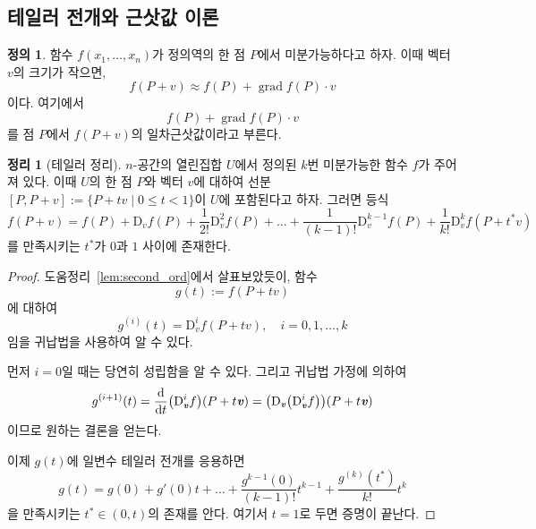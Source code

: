 \documentclass[unfonts,oneside,a4paper]{oblivoir}
\theoremstyle{definition}
\newtheorem{definition}{정의}[subsubsection]
\theoremstyle{theorem}
\newtheorem{theorem}{정리}[subsubsection]
\renewcommand{\vec}[1]{\bm{\mathit{#1}}}
\newcommand{\dD}{\mathrm{D}}
\DeclareMathOperator{\grad}{grad}
\begin{document}
\subsection{테일러 전개와 근삿값 이론}

\begin{definition}
    함수 $f(x_1, \dots, x_n)$가 정의역의 한 점 $P$에서 미분가능하다고 하자.
    이때 벡터 $\vec v$의 크기가 작으면,
    \begin{equation*}
        f(P + \vec v) \approx f(P) + \grad f(P) \cdot \vec v
    \end{equation*}
    이다.
    여기에서
    \begin{equation*}
        f(P) + \grad f(P) \cdot \vec v
    \end{equation*}
    를 점 $P$에서 $f(P + \vec v)$의 일차근삿값이라고 부른다.
\end{definition}

\begin{theorem}[테일러 정리]
    $n$-공간의 열린집합 $U$에서 정의된 $k$번 미분가능한 함수 $f$가 주어져 있다.
    이때 $U$의 한 점 $P$와 벡터 $\vec v$에 대하여 선분 $[P, P + \vec v] := \{P + t \vec v \mid 0 \leq t < 1\}$이 $U$에 포함된다고 하자.
    그러면 등식
    \begin{equation*}
        f(P + \vec v) = f(P) + \dD_{\vec v} f(P) + \frac{1}{2!} \dD_{\vec v}^2 f(P) + \dots + \frac{1}{(k - 1)!} \dD_{\vec v}^{k - 1} f(P) + \frac{1}{k!} \dD_{\vec v}^k f(P + t^* \vec v)
    \end{equation*}
    를 만족시키는 $t^*$가 $0$과 $1$ 사이에 존재한다.
\end{theorem}

\begin{proof}
    도움정리~\ref{lem:second_ord}에서 살표보았듯이, 함수
    \begin{equation*}
        g(t) := f(P + t \vec v)
    \end{equation*}
    에 대하여
    \begin{equation*}
        g^{(i)}(t) = \dD_{\vec v}^i f(P + t \vec v), \quad i = 0, 1, \dots, k
    \end{equation*}
    임을 귀납법을 사용하여 알 수 있다.

    먼저 $i = 0$일 때는 당연히 성립함을 알 수 있다.
    그리고 귀납법 가정에 의하여
    \begin{equation*}
        g^{(i + 1)}(t) = \diff*{\bigl(\dD_{\vec v}^i f\bigr)}{t} (P + t \vec v) = \bigl(\dD_{\vec v} \bigl(\dD_{\vec v}^i f\bigr)\bigr)(P + t \vec v)
    \end{equation*}
    이므로 원하는 결론을 얻는다.

    이제 $g(t)$에 일변수 테일러 전개를 응용하면
    \begin{equation*}
        g(t) = g(0) + g'(0) t + \dots + \frac{g^{k - 1}(0)}{(k - 1)!} t^{k - 1} + \frac{g^{(k)}(t^*)}{k!} t^k
    \end{equation*}
    을 만족시키는 $t^* \in (0, t)$의 존재를 안다.
    여기서 $t = 1$로 두면 증명이 끝난다.
\end{proof}
\end{document}

